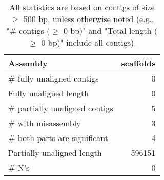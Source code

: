 \documentclass[12pt,a4paper]{article}
\begin{document}
\begin{table}[ht]
\begin{center}
\caption{All statistics are based on contigs of size $\geq$ 500 bp, unless otherwise noted (e.g., "\# contigs ($\geq$ 0 bp)" and "Total length ($\geq$ 0 bp)" include all contigs).}
\begin{tabular}{|l*{1}{|r}|}
\hline
Assembly & scaffolds \\ \hline
\# fully unaligned contigs & 0 \\ \hline
Fully unaligned length & 0 \\ \hline
\# partially unaligned contigs & 5 \\ \hline
\hspace{5mm}\# with misassembly & 3 \\ \hline
\hspace{5mm}\# both parts are significant & 4 \\ \hline
Partially unaligned length & 596151 \\ \hline
\# N's & 0 \\ \hline
\end{tabular}
\end{center}
\end{table}
\end{document}
